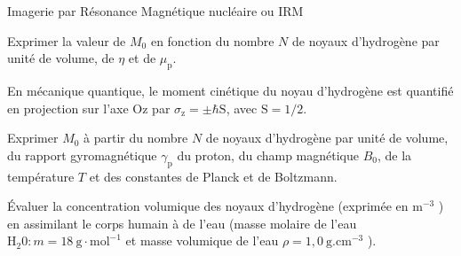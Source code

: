 \begin{exo}[PC][1][devoir]{Imagerie par Résonance Magnétique nucléaire ou IRM}
\begin{quest}
			\item Exprimer la valeur de ${M}_{0}$ en fonction du nombre ${N}$ de noyaux d'hydrogène par unité de volume, de $\eta$ et de $\mu_{\mathrm{p}}$.
		\end{quest}
		En mécanique quantique, le moment cinétique du noyau d'hydrogène est quantifié en projection sur l'axe Oz par $\sigma_{\mathrm{z}}= \pm \hbar \mathrm{S}$, avec $\mathrm{S}=1 / 2$.

		\begin{quest}
			\item Exprimer ${M}_{0}$ à partir du nombre ${N}$ de noyaux d'hydrogène par unité de volume, du rapport gyromagnétique $\gamma_{\mathrm{p}}$ du proton, du champ magnétique $B_0$, de la température ${T}$ et des constantes de Planck et de Boltzmann.

			\item Évaluer la concentration volumique des noyaux d'hydrogène (exprimée en $\mathrm{m}^{-3}$ ) en assimilant le corps humain à de l'eau (masse molaire de l'eau $\mathrm{H}_{2} 0: {m}=18 \mathrm{~g} \cdot \mathrm{mol}^{-1}$ et masse volumique de l'eau $\rho=1,0 \mathrm{~g} . \mathrm{cm}^{-3}$ ).


\end{quest}
\end{exo}
